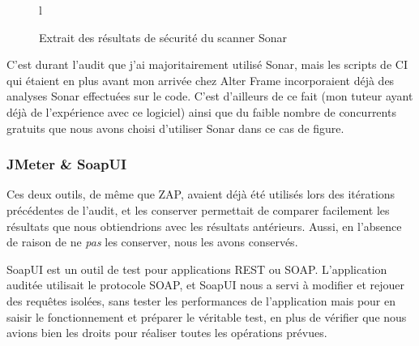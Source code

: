 \begin{figure}{l}
	\caption{Extrait des résultats de sécurité du scanner Sonar}
	\label{fig:sonar_sec}
\end{figure}

C'est durant l'audit que j'ai majoritairement utilisé Sonar, mais les scripts de CI qui étaient en plus avant mon arrivée chez Alter Frame incorporaient déjà des analyses Sonar effectuées sur le code. C'est d'ailleurs de ce fait (mon tuteur ayant déjà de l'expérience avec ce logiciel) ainsi que du faible nombre de concurrents gratuits\cite{squale} que nous avons choisi d'utiliser Sonar dans ce cas de figure.

\subsubsection{JMeter \& SoapUI}
Ces deux outils, de même que ZAP, avaient déjà été utilisés lors des itérations précédentes de l'audit, et les conserver permettait de comparer facilement les résultats que nous obtiendrions avec les résultats antérieurs. Aussi, en l'absence de raison de ne \emph{pas} les conserver, nous les avons conservés.

SoapUI\cite{soapui} est un outil de test pour applications REST ou SOAP. L'application auditée utilisait le protocole SOAP, et SoapUI nous a servi à modifier et rejouer des requêtes isolées, sans tester les performances de l'application mais pour en saisir le fonctionnement et préparer le véritable test, en plus de vérifier que nous avions bien les droits pour réaliser toutes les opérations prévues.

